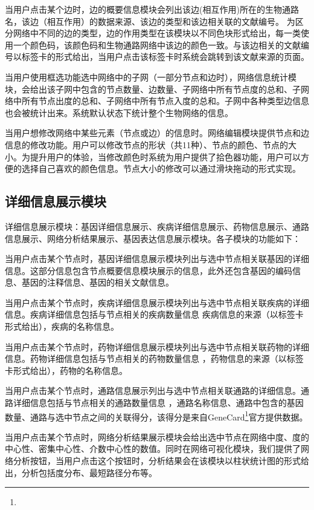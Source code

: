 当用户点击某个边时，边的概要信息模块会列出该边(相互作用)所在的生物通路名，该边（相互作用）的数据来源、该边的类型和该边相关联的文献编号。 为区分网络中不同的边的类型，边的作用类型在该模块以不同色块形式给出，每一类使用一个颜色码，该颜色码和生物通路网络中该边的颜色一致。与该边相关的文献编号以标签卡的形式给出，当用户点击该标签卡时系统会跳转到该文献来源的页面。

当用户使用框选功能选中网络中的子网（一部分节点和边时），网络信息统计模块，会给出该子网中包含的节点数量、边数量、子网络中所有节点度的总和、子网络中所有节点出度的总和、子网络中所有节点入度的总和。子网中各种类型边信息也会被统计出来。系统默认状态下统计整个生物网络的信息。

当用户想修改网络中某些元素（节点或边）的信息时。网络编辑模块提供节点和边信息的修改功能。用户可以修改节点的形状（共11种）、节点的颜色、节点的大小。为提升用户的体验，当修改颜色时系统为用户提供了拾色器功能，用户可以方便的选择自己喜欢的颜色信息。节点大小的修改可以通过滑块拖动的形式实现。

\subsection{详细信息展示模块}
详细信息展示模块：基因详细信息展示、疾病详细信息展示、药物信息展示、通路信息展示、网络分析结果展示、基因表达信息展示模块。各子模块的功能如下：

当用户点击某个节点时，基因详细信息展示模块列出与选中节点相关联基因的详细信息。这部分信息包含节点概要信息模块展示的信息，此外还包含基因的编码信息、基因的注释信息、基因的相关文献信息。

当用户点击某个节点时，疾病详细信息展示模块列出与选中节点相关联疾病的详细信息。疾病详细信息包括与节点相关的疾病数量信息
疾病信息的来源（以标签卡形式给出），疾病的名称信息。

当用户点击某个节点时，药物详细信息展示模块列出与选中节点相关联药物的详细信息。药物详细信息包括与节点相关的药物数量信息
，药物信息的来源（以标签卡形式给出），药物的名称信息。

当用户点击某个节点时，通路信息展示列出与选中节点相关联通路的详细信息。通路详细信息包括与节点相关的通路数量信息
，通路名称信息、通路中包含的基因数量、通路与选中节点之间的关联得分，该得分是来自GeneCard\footnote{}官方提供数据。

当用户点击某个节点时，网络分析结果展示模块会给出选中节点在网络中度、度的中心性、密集中心性、介数中心性的数值。同时在网络可视化模块，我们提供了网络分析按钮，当用户点击这个按钮时，分析结果会在该模块以柱状统计图的形式给出，分析包括度分布、最短路径分布等。

